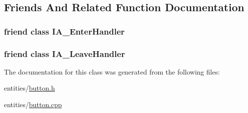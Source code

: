 \subsection{Friends And Related Function Documentation}
\hypertarget{class_button_ad46435fe6b8e9a384d33d608058862ae}{
\subsubsection[{I\-A\-\_\-\-Enter\-Handler}]{\setlength{\rightskip}{0pt plus 5cm}friend class {\bf I\-A\-\_\-\-Enter\-Handler}\hspace{0.3cm}{\ttfamily [friend]}}}\label{class_button_ad46435fe6b8e9a384d33d608058862ae}
\hypertarget{class_button_adc4c20007ad2fd4bc2556fbfbff54945}{
\subsubsection[{I\-A\-\_\-\-Leave\-Handler}]{\setlength{\rightskip}{0pt plus 5cm}friend class {\bf I\-A\-\_\-\-Leave\-Handler}\hspace{0.3cm}{\ttfamily [friend]}}}\label{class_button_adc4c20007ad2fd4bc2556fbfbff54945}


The documentation for this class was generated from the following files\-:\begin{DoxyCompactItemize}
\item 
entities/\hyperlink{button_8h}{button.\-h}\item 
entities/\hyperlink{button_8cpp}{button.\-cpp}\end{DoxyCompactItemize}
